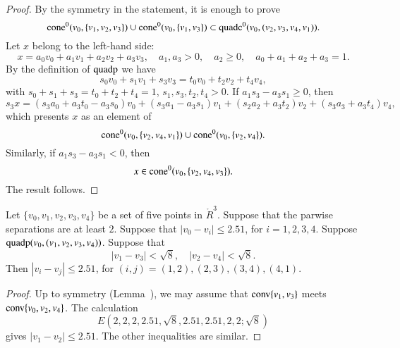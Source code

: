 \begin{proof}
By the symmetry in the statement, it is enough to prove 
  $${\operatorname{cone}}^0(v_0,\{v_1,v_2,v_3\})\cup{\operatorname{cone}}^0(v_0,\{v_1,v_3\})
  \subset {\operatorname{quadc}}^0(v_0,(v_2,v_3,v_4,v_1)).$$
Let $x$ belong to the left-hand side:
  $$
  x = a_0 v_0 + a_1 v_1 + a_2 v_2 + a_3 v_3,
  \quad a_1,a_3 > 0,\quad a_2\ge 0,\quad a_0+a_1+a_2+a_3=1.
  $$
By the definition of ${\operatorname{quadp}}$ we have
$$
  s_0 v_0 + s_1 v_1 + s_3 v_3 = t_0 v_0 + t_2 v_2 + t_4 v_4,
$$
with $s_0 + s_1 + s_3 = t_0 + t_2 + t_4 = 1$, $s_1,s_3,t_2,t_4>0$.
If $a_1 s_3 - a_3 s_1 \ge 0$, then
  $$s_3 x = (s_3 a_0 + a_3 t_0 - a_3 s_0) v_0 + 
          (s_3 a_1 - a_3 s_1) v_1 + (s_2 a_2 + a_3 t_2) v_2 +
          (s_3 a_3 + a_3 t_4) v_4,$$
which presents $x$ as an element of 
 $$
 {\operatorname{cone}}^0(v_0,\{v_2,v_4,v_1\}) \cup{\operatorname{cone}}^0(v_0,\{v_2,v_4\}).
 $$
Similarly, if $a_1 s_3 - a_3 s_1 < 0$, then
  $$
  x\in {\operatorname{cone}}^0(v_0,\{v_2,v_4,v_3\}).
  $$
The result follows.
\end{proof}

\newpage


\begin{lemma}  
Let $\{v_0,v_1,v_2,v_3,v_4\}$ be a set of five points in
$\ring{R}^3$.  Suppose that the parwise separations are at
least $2$.  
Suppose that $|v_0-v_i|\le 2.51$, for $i=1,2,3,4$.
Suppose ${\operatorname{quadp}}(v_0,(v_1,v_2,v_3,v_4))$.
Suppose that
  $$|v_1-v_3|<\sqrt8,\quad |v_2-v_4| <\sqrt8.$$
Then $|v_i-v_j|\le 2.51$, for $(i,j)=(1,2),(2,3),(3,4),(4,1)$.
\end{lemma}


\begin{proof}
Up to symmetry (Lemma~), we may assume
that ${\operatorname{conv}}\{v_1,v_3\}$ meets ${\operatorname{conv}}\{v_0,v_2,v_4\}$.
The calculation
   $$
   E(2,2,2,2.51,\sqrt8,2.51,2.51,2,2; \sqrt8)
   $$
gives $|v_1-v_2|\le 2.51$. The other inequalities are similar.
\end{proof}

